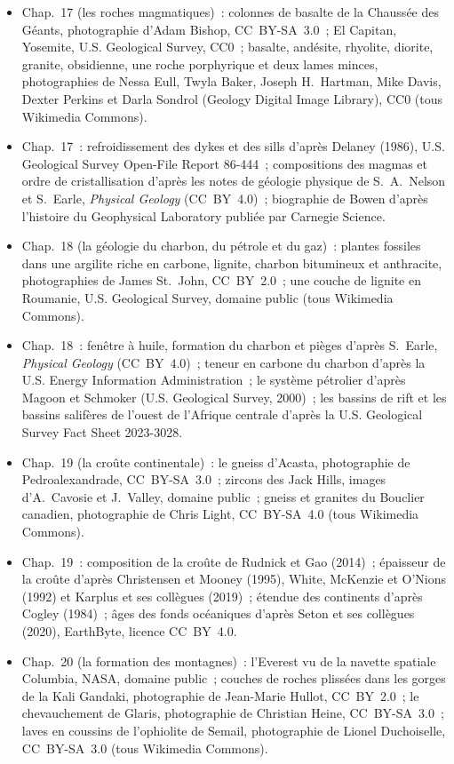 \begin{itemize}
  \item Chap.~17 (les roches magmatiques)~: colonnes de basalte de la Chaussée des Géants, photographie d'Adam Bishop, CC~BY-SA~3.0~; El Capitan, Yosemite, U.S. Geological Survey, CC0~; basalte, andésite, rhyolite, diorite, granite, obsidienne, une roche porphyrique et deux lames minces, photographies de Nessa Eull, Twyla Baker, Joseph H.~Hartman, Mike Davis, Dexter Perkins et Darla Sondrol (Geology Digital Image Library), CC0 (tous Wikimedia Commons).
  \item Chap.~17~: refroidissement des dykes et des sills d'après Delaney (1986), U.S. Geological Survey Open-File Report 86-444~; compositions des magmas et ordre de cristallisation d'après les notes de géologie physique de S.~A.~Nelson et S.~Earle, \emph{Physical Geology} (CC~BY~4.0)~; biographie de Bowen d'après l'histoire du Geophysical Laboratory publiée par Carnegie Science.
  \item Chap.~18 (la géologie du charbon, du pétrole et du gaz)~: plantes fossiles dans une argilite riche en carbone, lignite, charbon bitumineux et anthracite, photographies de James St.~John, CC~BY~2.0~; une couche de lignite en Roumanie, U.S. Geological Survey, domaine public (tous Wikimedia Commons).
  \item Chap.~18~: fenêtre à huile, formation du charbon et pièges d'après S.~Earle, \emph{Physical Geology} (CC~BY~4.0)~; teneur en carbone du charbon d'après la U.S. Energy Information Administration~; le système pétrolier d'après Magoon et Schmoker (U.S. Geological Survey, 2000)~; les bassins de rift et les bassins salifères de l'ouest de l'Afrique centrale d'après la U.S. Geological Survey Fact Sheet 2023-3028.
  \item Chap.~19 (la croûte continentale)~: le gneiss d'Acasta, photographie de Pedroalexandrade, CC~BY-SA~3.0~; zircons des Jack Hills, images d'A.~Cavosie et J.~Valley, domaine public~; gneiss et granites du Bouclier canadien, photographie de Chris Light, CC~BY-SA~4.0 (tous Wikimedia Commons).
  \item Chap.~19~: composition de la croûte de Rudnick et Gao (2014)~; épaisseur de la croûte d'après Christensen et Mooney (1995), White, McKenzie et O'Nions (1992) et Karplus et ses collègues (2019)~; étendue des continents d'après Cogley (1984)~; âges des fonds océaniques d'après Seton et ses collègues (2020), EarthByte, licence CC~BY~4.0.
  \item Chap.~20 (la formation des montagnes)~: l'Everest vu de la navette spatiale Columbia, NASA, domaine public~; couches de roches plissées dans les gorges de la Kali Gandaki, photographie de Jean-Marie Hullot, CC~BY~2.0~; le chevauchement de Glaris, photographie de Christian Heine, CC~BY-SA~3.0~; laves en coussins de l'ophiolite de Semail, photographie de Lionel Duchoiselle, CC~BY-SA~3.0 (tous Wikimedia Commons).

\end{itemize}
